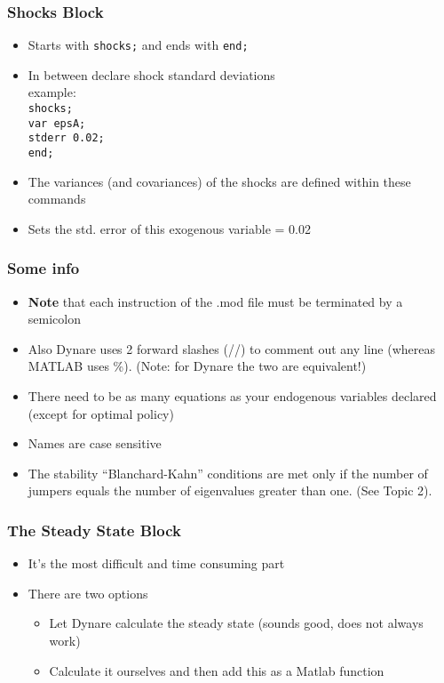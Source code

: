 \documentclass[xcolor=dvipsnames,handout,aspectratio=169]{beamer}
\begin{document}
\begin{frame}[t]\frametitle{\textbf{Shocks Block}}
  \begin{itemize}
\setlength\itemsep{2em}
  \item Starts with \texttt{shocks;} and ends with \texttt{end;} 
  \item In between declare shock standard deviations \\
  example: \\ \texttt{shocks;} \\ \texttt{var epsA; \\ stderr 0.02;}\\ \texttt{end;}
  \item The variances (and covariances) of the shocks are defined within these commands 
  \item Sets the std. error of this exogenous variable = 0.02
  \end{itemize}
\end{frame}

\begin{frame}[t]\frametitle{\textbf{Some info}}
\begin{itemize}
      \setlength\itemsep{2em}
     \item \textbf{Note} that each instruction of the .mod file must be terminated by a semicolon
    \item Also Dynare uses 2 forward slashes (//) to comment out any line (whereas MATLAB uses \%). (Note: for Dynare the two are equivalent!)
     \item There need to be as many equations as your endogenous variables declared (except for optimal policy)
     \item Names are case sensitive
     \item The stability ``Blanchard-Kahn'' conditions are met only if the number of jumpers equals the number of eigenvalues greater than one. (See Topic 2).
  \end{itemize}
\end{frame}

\begin{frame}[t]\frametitle{\textbf{The Steady State Block}}
  \begin{itemize}
     \setlength\itemsep{2em}
    \item It's the most difficult and time consuming part
    \item There are two options
    \begin{itemize}
      \item Let Dynare calculate the steady state (sounds good, does not always work)
      \item Calculate it ourselves and then add this as a Matlab function
    \end{itemize}
  \end{itemize}
\end{frame}
\end{document}
